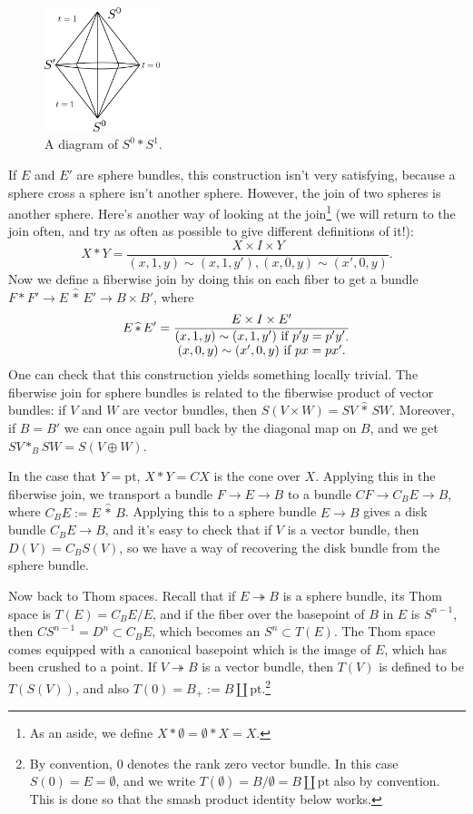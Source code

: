 \documentclass{article}
\newcommand{\pt}[1]{#1_+}
\newcommand{\ptspace}{\mathrm{pt}}
\newcommand{\onto}{\twoheadrightarrow}
\begin{document}
\begin{figure} %
\centering\includegraphics[width=0.3\textwidth]{figures/fig9.pdf}
\caption{\small A diagram of $S^0 \ast S^1$.}
\end{figure}
If $E$ and $E'$ are sphere bundles, this construction isn't very satisfying, because a sphere cross a sphere isn't another sphere.  However, the join of two spheres is another sphere.  Here's another way of looking at the join\footnote{As an aside, we define $X \ast \emptyset = \emptyset \ast X = X$.} (we will return to the join often, and try as often as possible to give different definitions of it!):
\[
X \ast Y = \frac{X \times I \times Y}{(x, 1, y) \sim (x, 1, y'), (x, 0, y) \sim (x', 0, y)}.
\]
Now we define a fiberwise join by doing this on each fiber to get a bundle $F \ast F' \to E\, \widehat\ast\,  E' \to B \times B'$, where \[E\, \widehat\ast\, E' = \frac{E \times I \times E'}{\substack{\hbox{$(x, 1, y) \sim (x, 1, y')$ if $p'y = p'y'$}, \\ \hbox{$(x, 0, y) \sim (x', 0, y)$ if $px = px'$.}}}\]  One can check that this construction yields something locally trivial.  The fiberwise join for sphere bundles is related to the fiberwise product of vector bundles: if $V$ and $W$ are vector bundles, then $S(V \times W) = SV \,\widehat \ast \,SW$.  Moreover, if $B = B'$ we can once again pull back by the diagonal map on $B$, and we get $SV \ast_B SW = S(V \oplus W)$.

In the case that $Y = \ptspace$, $X \ast Y = CX$ is the cone over $X$.  Applying this in the fiberwise join, we transport a bundle $F \to E \to B$ to a bundle $CF \to C_B E \to B$, where $C_BE:=E\,\widehat\ast\,B$.  Applying this to a sphere bundle $E \to B$ gives a disk bundle $C_B E \to B$, and it's easy to check that if $V$ is a vector bundle, then $D(V) = C_B S(V)$, so we have a way of recovering the disk bundle from the sphere bundle.

Now back to Thom spaces.  Recall that if $E \onto B$ is a sphere bundle, its Thom space is $T(E) = C_B E / E$, and if the fiber over the basepoint of $B$ in $E$ is $S^{n-1}$, then $CS^{n-1} = D^n \subset C_B E$, which becomes an $S^n \subset T(E)$.  The Thom space comes equipped with a canonical basepoint which is the image of $E$, which has been crushed to a point.  If $V \onto B$ is a vector bundle, then $T(V)$ is defined to be $T(S(V))$, and also $T(0) = \pt{B}:=B \amalg \ptspace$.\footnote{By convention, $0$ denotes the rank zero vector bundle.  In this case $S(0) = E = \emptyset$, and we write $T(\emptyset) = B / \emptyset = B \amalg \ptspace$ also by convention.  This is done so that the smash product identity below works.}
\end{document}
